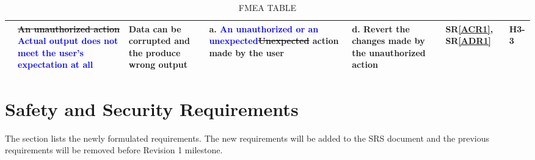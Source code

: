 \documentclass{article}
\begin{document}
\begin{landscape}
\begin{table}[H]
{\begin{tabular}{|p{1.8 in}|p{2.0 in}|p{2 in}|p{2 in}|p{2.3 in}|p{0.5 in}|p{0.5 in}|}
& \sout{An unauthorized action} \textcolor{blue}{Actual output does not meet the user's expectation at all}
& Data can be corrupted and the produce wrong output 
&
a. \textcolor{blue}{An unauthorized or an unexpected}\sout{Unexpected} action made by the user\newline
& 
d. Revert the changes made by the unauthorized action\newline
& SR\ref{ACR1}, SR\ref{ADR1}
& H3-3 \\ \hline



 

\end{tabular}
}
\caption{FMEA TABLE}
\label{Table:FMEA TABLE}
\end{table}
\end{landscape}


\section{Safety and Security Requirements}
The section lists the newly formulated requirements. The new requirements will be added to the SRS document and the previous requirements will be removed before Revision 1 milestone.
\end{document}
